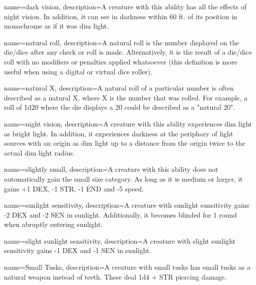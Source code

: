 {
    name={dark vision},
    description={A creature with this ability has all the effects of night
        vision. In addition, it can see in darkness within 60 ft. of its
        position in monochrome as if it was dim light.}
}

{
    name={natural roll},
    description={A natural roll is the number displayed on the die/dice after
    any check or roll is made. Alternatively, it is the result of a die/dice
    roll with no modifiers or penalties applied whatsoever (this definition
    is more useful when using a digital or virtual dice roller).}
}

{
    name={natural X},
    description={A natural roll of a particular number is often described as a
    natural X, where X is the number that was rolled. For example, a roll of
    1d20 where the die displays a 20 could be described as a "natural 20".}
}

{
    name={night vision},
    description={A creature with this ability experiences dim light as bright
        light. In addition, it experiences darkness at the periphary of light
        sources with an origin as dim light up to a distance from the origin 
        twice to the actual dim light radius.}
}

{
    name={slightly small},
    description={A creature with this ability does not automatically gain the
        small size category. As long as it is medium or larger, it gains +1
        DEX, -1 STR, -1 END and -5 speed.}
}

{
    name={sunlight sensitivity},
    description={A creature with sunlight sunsitivity gains -2 DEX and -2 SEN
        in sunlight. Additionally, it becomes blinded for 1 round when abruptly
        entering sunlight.}
}

{
    name={slight sunlight sensitivity},
    description={A creature with slight sunlight sensitivity gains -1 DEX and
        -1 SEN in sunlight.}
}

{
    name={Small Tusks},
    description={A creature with small tusks has small tusks as a natural
        weapon instead of teeth. These deal 1d4 + STR piercing damage.}
}
